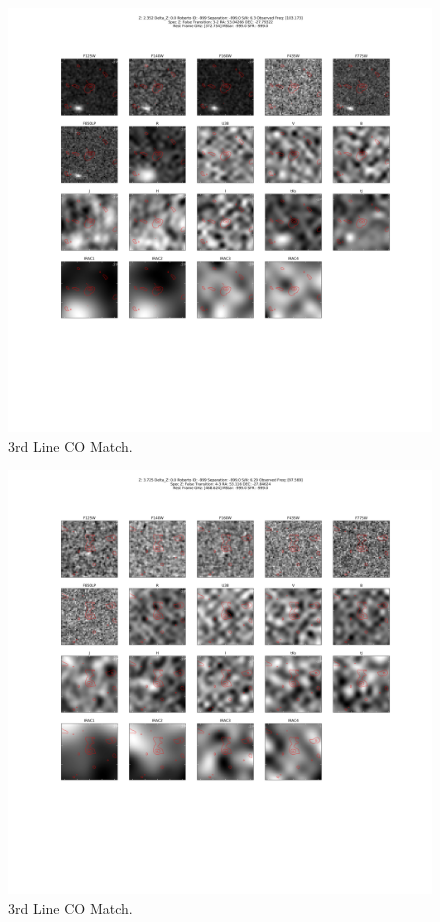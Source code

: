 \begin{figure}[tbp]
\centering \includegraphics[width=120mm]{Matched/ASPECS_Cutout_15.png}
\caption{3rd Line CO Match.}
\label{fig:Match_Three}
\end{figure}

\begin{figure}[tbp]
\centering \includegraphics[width=120mm]{Matched/ASPECS_Cutout_16.png}
\caption{3rd Line CO Match.}
\label{fig:Match_Three}
\end{figure}

